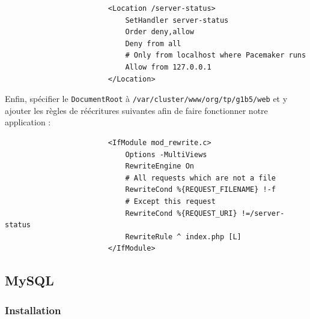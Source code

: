 \documentclass[11pt,a4paper]{report}
\begin{document}
                    \begin{verbatim}
                        <Location /server-status>
                            SetHandler server-status
                            Order deny,allow
                            Deny from all
                            # Only from localhost where Pacemaker runs
                            Allow from 127.0.0.1
                        </Location>
                    \end{verbatim}
                    
                    Enfin, spécifier le \verb+DocumentRoot+ à \verb+/var/cluster/www/org/tp/g1b5/web+ et y ajouter les règles de réécritures suivantes afin de faire fonctionner notre application :\\
                    
                    \begin{verbatim}
                        <IfModule mod_rewrite.c>
                            Options -MultiViews
                            RewriteEngine On
                            # All requests which are not a file
                            RewriteCond %{REQUEST_FILENAME} !-f
                            # Except this request
                            RewriteCond %{REQUEST_URI} !=/server-status
                            RewriteRule ^ index.php [L]
                        </IfModule>
                    \end{verbatim}
                    
            \subsection{MySQL}
    
                \subsubsection{Installation}
                    
\end{document}
